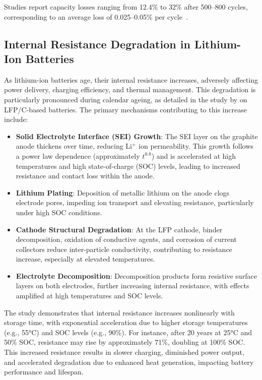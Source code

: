Studies report capacity losses ranging from 12.4\% to 32\% after 500--800 cycles, corresponding to an average loss of 0.025--0.05\% per cycle~\cite{zhang_studies_2000}.


\subsection{Internal Resistance Degradation in Lithium-Ion Batteries}

As lithium-ion batteries age, their internal resistance increases, adversely affecting power delivery, charging efficiency, and thermal management. This degradation is particularly pronounced during calendar ageing, as detailed in the study by \cite{stroe_degradation_2018} on LFP/C-based batteries. The primary mechanisms contributing to this increase include:

\begin{itemize}
\item \textbf{Solid Electrolyte Interface (SEI) Growth}: The SEI layer on the graphite anode thickens over time, reducing Li$^+$ ion permeability. This growth follows a power law dependence (approximately $t^{0.8}$) and is accelerated at high temperatures and high state-of-charge (SOC) levels, leading to increased resistance and contact loss within the anode.
\item \textbf{Lithium Plating}: Deposition of metallic lithium on the anode clogs electrode pores, impeding ion transport and elevating resistance, particularly under high SOC conditions.
\item \textbf{Cathode Structural Degradation}: At the LFP cathode, binder decomposition, oxidation of conductive agents, and corrosion of current collectors reduce inter-particle conductivity, contributing to resistance increase, especially at elevated temperatures.
\item \textbf{Electrolyte Decomposition}: Decomposition products form resistive surface layers on both electrodes, further increasing internal resistance, with effects amplified at high temperatures and SOC levels.
\end{itemize}

The study demonstrates that internal resistance increases nonlinearly with storage time, with exponential acceleration due to higher storage temperatures (e.g., 55°C) and SOC levels (e.g., 90\%). For instance, after 20 years at 25°C and 50\% SOC, resistance may rise by approximately 71\%, doubling at 100\% SOC. This increased resistance results in slower charging, diminished power output, and accelerated degradation due to enhanced heat generation, impacting battery performance and lifespan.

